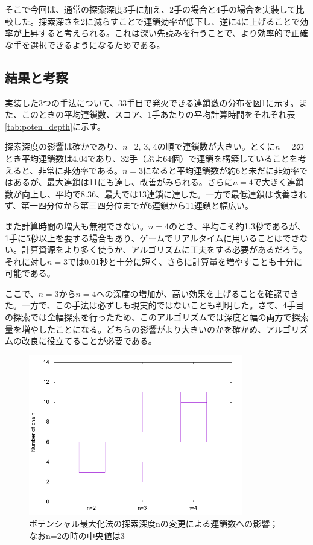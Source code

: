 \documentclass[12pt]{jreport}
\begin{document}
そこで今回は、通常の探索深度3手に加え、2手の場合と4手の場合を実装して比較した。探索深さを2に減らすことで連鎖効率が低下し、逆に4に上げることで効率が上昇すると考えられる。これは深い先読みを行うことで、より効率的で正確な手を選択できるようになるためである。

\subsection{結果と考察}
実装した3つの手法について、33手目で発火できる連鎖数の分布を図\ref{fig:poten_chain_depth}に示す。また、このときの平均連鎖数、スコア、1手あたりの平均計算時間をそれぞれ表\ref{tab:poten_depth}に示す。

探索深度の影響は確かであり、$n$=2, 3, 4の順で連鎖数が大きい。とくに$n=2$のとき平均連鎖数は4.04であり、32手（ぷよ64個）で連鎖を構築していることを考えると、非常に非効率である。$n=3$になると平均連鎖数が約6と未だに非効率ではあるが、最大連鎖は11にも達し、改善がみられる。さらに$n=4$で大きく連鎖数が向上し、平均で8.36、最大では13連鎖に達した。一方で最低連鎖は改善されず、第一四分位から第三四分位までが6連鎖から11連鎖と幅広い。

また計算時間の増大も無視できない。$n=4$のとき、平均こそ約1.3秒であるが、1手に5秒以上を要する場合もあり、ゲームでリアルタイムに用いることはできない。計算資源をより多く使うか、アルゴリズムに工夫をする必要があるだろう。それに対し$n=3$では0.01秒と十分に短く、さらに計算量を増やすことも十分に可能である。

ここで、$n=3$から$n=4$への深度の増加が、高い効果を上げることを確認できた。一方で、この手法は必ずしも現実的ではないことも判明した。さて、4手目の探索では全幅探索を行ったため、このアルゴリズムでは深度と幅の両方で探索量を増やしたことになる。どちらの影響がより大きいのかを確かめ、アルゴリズムの改良に役立てることが必要である。

\begin{figure}[tb]
  \begin{center}
  \includegraphics[height=7cm]{graph/Potential/chain_N2_4.png}
  \caption{ポテンシャル最大化法の探索深度nの変更による連鎖数への影響；なおn=2の時の中央値は3} \label{fig:poten_chain_depth}
\end{center}
\end{figure}
\end{document}
